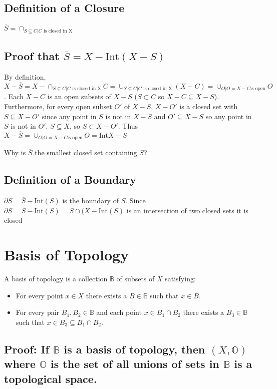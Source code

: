 \documentclass{homework}
\newcommand{\inte}{\text{Int}}
\newcommand{\clos}[1]{\overline{#1}}
\newcommand{\BB}{\mathbb{B}}
\newcommand{\OO}{\mathbb{O}}
\begin{document}
\subsection{Definition of a Closure}
$\clos{S} = \cap_{S \subseteq C | C \text{ is closed in X}}$
\subsection{Proof that $\clos{S} = X - \inte(X - S)$}

By definition, $X - \clos{S} = X -  \cap_{S \subseteq C | C \text{ is closed in X}} C = \cup_{S \subseteq C | C \text{ is closed in X}}(X - C) = \cup_{O| O = X - C \text{is open} }O$. Each $X - C$ is an open subsets of $X - S$ ($S \subset C$ so $X - C \subseteq X - S$). Furthermore, for every open subset $O'$ of $X -S$, $X - O'$ is a closed set with $S \subseteq X - O'$ since any point in $S$ is not in $X - S$ and $O' \subseteq X - S$ so any point in $S$ is not in $O'$. $S \subseteq X$, so $S \subset X - O'$. Thus$X - \clos{S} = \cup_{O| O = X - C \text{is open} }O = \inte{X - S}$

\question Why is $\clos{S}$ the smallest closed set containing $S$?

\subsection{Definition of a Boundary}

$\partial S = \clos{S} - \inte(S)$ is the boundary of $S$. Since $\partial S = \clos{S} - \inte(S) = \clos{S} \cap (X - \inte(S)$ is an intersection of two closed sets it is closed

\section{Basis of Topology}
A basis of topology is a collection $\BB$ of subsets of $X$ satisfying:
\begin{itemize}
    \item For every point $x \in X$ there exists a $B \in \BB$ such that $x \in B$. 
    \item For every pair $B_1, B_2 \in \BB$ and each point $x \in B_1 \cap B_2$ there exists a $B_3 \in \BB$ such that $x \in B_3 \subseteq B_1 \cap B_2$.
\end{itemize}

\subsection{Proof: If $\BB$ is a basis of topology, then $(X, \OO)$ where $\OO$ is the set of all unions of sets in $\BB$ is a topological space. }
\end{document}
